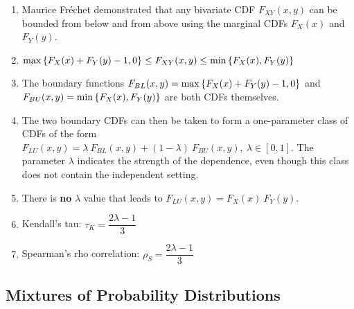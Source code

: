 \begin{enumerate}
    \item Maurice Fréchet demonstrated that any bivariate CDF $F _{X Y} (x, y)$ can be bounded from below and from above using the marginal CDFs $F_X (x)$ and $F_Y (y)$.
    \hfill \cite{statistics/book/Statistics-for-Data-Scientists/Maurits-Kaptein}

    \item
    $
        \max\left\{F_X (x) + F_Y (y) - 1, 0\right\}
        \leq
        F _{X Y} (x, y)
        \leq
        \min\left\{F_X (x), F_Y (y)\right\}
    $
    \hfill \cite{statistics/book/Statistics-for-Data-Scientists/Maurits-Kaptein}

    \item The boundary functions $F_{B L} (x, y) = \max\left\{F_X (x) + F_Y (y) - 1, 0\right\}$ and $F_{ BU} (x, y) = \min\left\{F_X (x), F_Y (y)\right\}$ are both CDFs themselves.
    \hfill \cite{statistics/book/Statistics-for-Data-Scientists/Maurits-Kaptein}

    \item The two boundary CDFs can then be taken to form a one-parameter class of CDFs of the form $F_{LU} (x, y) = \lambda\ F_{B L} (x, y) + (1 - \lambda)\ F_{BU} (x, y),\ \lambda \in [0, 1]$.
    The parameter $\lambda$ indicates the strength of the dependence, even though this class does not contain the independent setting.
    \hfill \cite{statistics/book/Statistics-for-Data-Scientists/Maurits-Kaptein}

    \item There is \textbf{no} $\lambda$ value that leads to $F_{LU} (x, y) = F_X (x)\ F_Y (y)$.
    \hfill \cite{statistics/book/Statistics-for-Data-Scientists/Maurits-Kaptein}

    \item Kendall’s tau: $\tau_K = \dfrac{2\lambda - 1}{3}$
    \hfill \cite{statistics/book/Statistics-for-Data-Scientists/Maurits-Kaptein}

    \item Spearman’s rho correlation: $\rho_S = \dfrac{2\lambda -1}{3}$
    \hfill \cite{statistics/book/Statistics-for-Data-Scientists/Maurits-Kaptein}
\end{enumerate}



\subsection{Mixtures of Probability Distributions}

